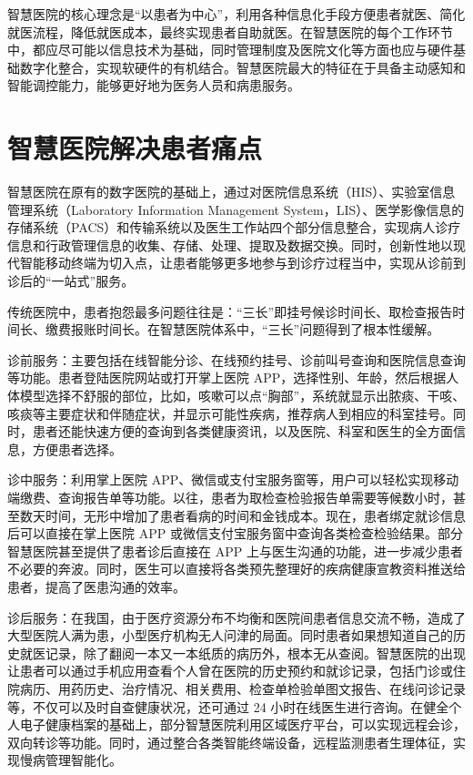 \documentclass[doctor,secret]{thuthesis}
\begin{document}
智慧医院的核心理念是“以患者为中心”，利用各种信息化手段方便患者就医、简化就医流程，降低就医成本，最终实现患者自助就医。在智慧医院的每个工作环节中，都应尽可能以信息技术为基础，同时管理制度及医院文化等方面也应与硬件基础数字化整合，实现软硬件的有机结合。智慧医院最大的特征在于具备主动感知和智能调控能力，能够更好地为医务人员和病患服务。

\section{智慧医院解决患者痛点}
\label{sec:org5f8c752}
智慧医院在原有的数字医院的基础上，通过对医院信息系统（HIS）、实验室信息管理系统（Laboratory Information Management System，LIS）、医学影像信息的存储系统（PACS）和传输系统以及医生工作站四个部分信息整合，实现病人诊疗信息和行政管理信息的收集、存储、处理、提取及数据交换。同时，创新性地以现代智能移动终端为切入点，让患者能够更多地参与到诊疗过程当中，实现从诊前到诊后的“一站式”服务。

传统医院中，患者抱怨最多问题往往是：“三长”即挂号候诊时间长、取检查报告时间长、缴费报账时间长。在智慧医院体系中，“三长”问题得到了根本性缓解。

诊前服务：主要包括在线智能分诊、在线预约挂号、诊前叫号查询和医院信息查询等功能。患者登陆医院网站或打开掌上医院 APP，选择性别、年龄，然后根据人体模型选择不舒服的部位，比如，咳嗽可以点“胸部”，系统就显示出脓痰、干咳、咳痰等主要症状和伴随症状，并显示可能性疾病，推荐病人到相应的科室挂号。同时，患者还能快速方便的查询到各类健康资讯，以及医院、科室和医生的全方面信息，方便患者选择。

诊中服务：利用掌上医院 APP、微信或支付宝服务窗等，用户可以轻松实现移动端缴费、查询报告单等功能。以往，患者为取检查检验报告单需要等候数小时，甚至数天时间，无形中增加了患者看病的时间和金钱成本。现在，患者绑定就诊信息后可以直接在掌上医院 APP 或微信支付宝服务窗中查询各类检查检验结果。部分智慧医院甚至提供了患者诊后直接在 APP 上与医生沟通的功能，进一步减少患者不必要的奔波。同时，医生可以直接将各类预先整理好的疾病健康宣教资料推送给患者，提高了医患沟通的效率。

诊后服务：在我国，由于医疗资源分布不均衡和医院间患者信息交流不畅，造成了大型医院人满为患，小型医疗机构无人问津的局面。同时患者如果想知道自己的历史就医记录，除了翻阅一本又一本纸质的病历外，根本无从查阅。智慧医院的出现让患者可以通过手机应用查看个人曾在医院的历史预约和就诊记录，包括门诊或住院病历、用药历史、治疗情况、相关费用、检查单检验单图文报告、在线问诊记录等，不仅可以及时自查健康状况，还可通过 24 小时在线医生进行咨询。在健全个人电子健康档案的基础上，部分智慧医院利用区域医疗平台，可以实现远程会诊，双向转诊等功能。同时，通过整合各类智能终端设备，远程监测患者生理体征，实现慢病管理智能化。
\end{document}
